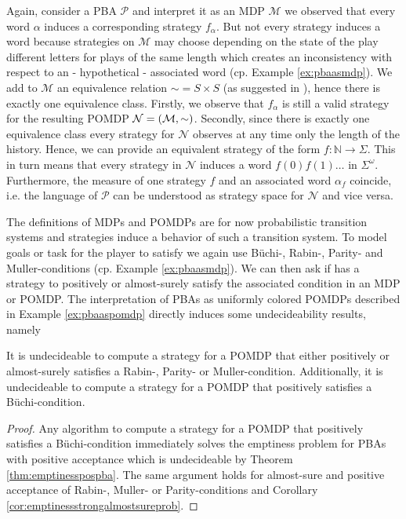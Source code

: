 \begin{example}
  Again, consider a \ac{PBA} $\mathcal{P}$ and interpret it as an \ac{MDP}
  $\mathcal{M}$ we observed that every word $\alpha$ induces a corresponding
  strategy $f_{\alpha}$. But not every strategy induces a word because
  strategies on $\mathcal{M}$ may choose depending on the state of the play
  different letters for plays of the same length which creates an inconsistency
  with respect to an - hypothetical - associated word (cp. Example 
  \ref{ex:pbaasmdp}). We add to $\mathcal{M}$ an equivalence relation
  $\sim = S \times S$ (as suggested in \cite{DecProblemsForProbAuto}), hence 
  there is exactly one equivalence class.
  Firstly, we observe that $f_{\alpha}$ is still a valid strategy for the
  resulting \ac{POMDP} $\mathcal{N} = \left(\mathcal{M}, \sim\right)$. Secondly,
  since there is exactly one equivalence class every strategy for $\mathcal{N}$
  observes at any time only the length of the history. Hence, we can provide an
  equivalent strategy of the form $f:\mathbb{N}\rightarrow \Sigma$. This
  in turn means that every strategy in $\mathcal{N}$ induces a word
  $f(0)f(1)\dots$ in $\Sigma^{\omega}$. Furthermore, the measure of one
  strategy $f$ and an associated word $\alpha_{f}$ coincide, i.e. the language
  of $\mathcal{P}$ can be understood as strategy space for $\mathcal{N}$ and
  vice versa.
  \label{ex:pbaaspomdp}
\end{example}
The definitions of \acp{MDP} and \acp{POMDP} are for now probabilistic 
transition systems and strategies induce a behavior of such a transition 
system. To model goals or task for the player to satisfy we again use 
Büchi-, Rabin-, Parity- and Muller-conditions (cp. Example \ref{ex:pbaasmdp}). 
We can then ask if \eve{} has a strategy to positively or almost-surely satisfy 
the associated condition in an \ac{MDP} or \ac{POMDP}. The interpretation of
\acp{PBA} as uniformly colored \acp{POMDP} described in Example
\ref{ex:pbaaspomdp} directly induces some undecideability results, namely
\begin{corollary}
  \cite[Corollary 3 (a)]{DecProblemsForProbAuto}
  \cite[Theorem 5]{QualAnaPOMDP}
  It is undecideable to compute a strategy for a \ac{POMDP} that either 
  positively or almost-surely satisfies a Rabin-, Parity- or Muller-condition.
  Additionally, it is undecideable to compute a strategy for a \ac{POMDP} that
  positively satisfies a Büchi-condition.
  \label{cor:posstratpomdp}
\end{corollary}
\begin{proof}
  Any algorithm to compute a strategy for a \ac{POMDP} that positively 
  satisfies a Büchi-condition immediately solves the emptiness problem for
  \acp{PBA} with positive acceptance which is undecideable by Theorem 
  \ref{thm:emptinesspospba}. The same argument holds for almost-sure and
  positive acceptance of Rabin-, Muller- or Parity-conditions and Corollary
  \ref{cor:emptinessstrongalmostsureprob}.
\end{proof}


